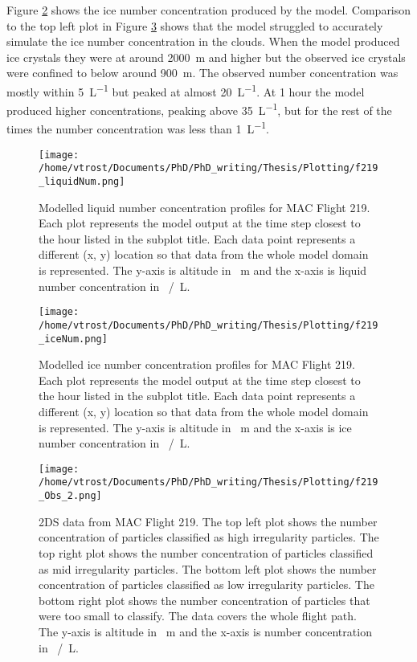 Figure \ref{fig:moncIce} shows the ice number concentration produced by the model. Comparison to the top left plot in Figure \ref{fig:obs_2} shows that the model struggled to accurately simulate the ice number concentration in the clouds. When the model produced ice crystals they were at around \SI{2000}{m} and higher but the observed ice crystals were confined to below around \SI{900}{m}. The observed number concentration was mostly within \SI{5}{L^{-1}} but peaked at almost \SI{20}{L^{-1}}. At 1 hour the model produced higher concentrations, peaking above \SI{35}{L^{-1}}, but for the rest of the times the number concentration was less than \SI{1}{L^{-1}}.

\begin{figure}[H]
	\centering
	\texttt{[image: /home/vtrost/Documents/PhD/PhD\_writing/Thesis/Plotting/f219\_liquidNum.png]}
	\caption{Modelled liquid number concentration profiles for MAC Flight 219. Each plot represents the model output at the time step closest to the hour listed in the subplot title. Each data point represents a different (x, y) location so that data from the whole model domain is represented. The y-axis is altitude in \SI{}{m} and the x-axis is liquid number concentration in \SI{}{/L}.}
	\label{fig:moncliquid}
\end{figure}

\begin{figure}[H]
	\centering
	\texttt{[image: /home/vtrost/Documents/PhD/PhD\_writing/Thesis/Plotting/f219\_iceNum.png]}
	\caption{Modelled ice number concentration profiles for MAC Flight 219. Each plot represents the model output at the time step closest to the hour listed in the subplot title. Each data point represents a different (x, y) location so that data from the whole model domain is represented. The y-axis is altitude in \SI{}{m} and the x-axis is ice number concentration in \SI{}{/L}.}
	\label{fig:moncIce}
\end{figure}

\begin{figure}[H]
	\centering
	\texttt{[image: /home/vtrost/Documents/PhD/PhD\_writing/Thesis/Plotting/f219\_Obs\_2.png]}
	\caption{2DS data from MAC Flight 219. The top left plot shows the number concentration of particles classified as high irregularity particles. The top right plot shows the number concentration of particles classified as mid irregularity particles. The bottom left plot shows the number concentration of particles classified as low irregularity particles. The bottom right plot shows the number concentration of particles that were too small to classify. The data covers the whole flight path. The y-axis is altitude in \SI{}{m} and the x-axis is number concentration in \SI{}{/L}.}
	\label{fig:obs_2}
\end{figure}


